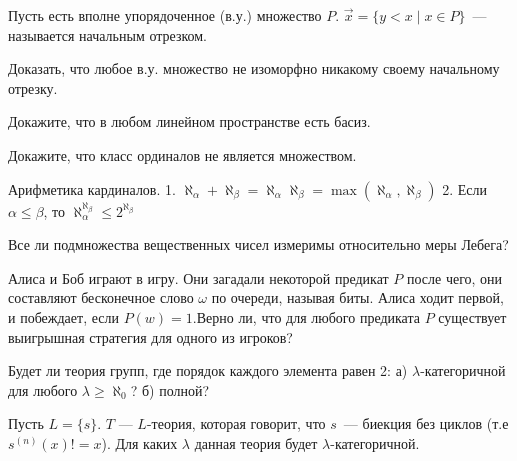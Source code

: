 \setcounter{curtask}{6}


Пусть есть вполне упорядоченное (в.у.) множество $P$.
$\vec{x} = \{y < x \mid x \in P\}$~--- называется начальным отрезком.

\begin{task}
    Доказать, что любое в.у. множество не изоморфно никакому своему начальному отрезку.
\end{task}

\begin{task}
    Докажите, что в любом линейном пространстве есть басиз.
\end{task}

\begin{task}
    Докажите, что класс ординалов не является множеством.
\end{task}

\begin{task}
    Арифметика кардиналов.
    1. $\aleph_{\alpha} + \aleph_{\beta} = \aleph_{\alpha}  \aleph_{\beta} =
    	\max(\aleph_{\alpha}, \aleph_{\beta})$
    2. Если $\alpha \le \beta$, то $\aleph_{\alpha}^{\aleph_{\beta}} \le 2^{\aleph_{\beta}}$
\end{task}

\begin{task}
    Все ли подмножества вещественных чисел измеримы относительно меры Лебега?
\end{task}

\begin{task}
    Алиса и Боб играют в игру. Они загадали некоторой предикат $P$ после чего, они
    составляют бесконечное слово $\omega$ по очереди, называя биты. Алиса ходит
    первой, и побеждает, если $P(w) = 1$.Верно ли, что для любого предиката $P$
    существует выигрышная стратегия для одного из игроков?
\end{task}

\begin{task}
    Будет ли теория групп, где порядок каждого элемента равен 2:
    а) $\lambda$-категоричной для любого $\lambda \ge \aleph_0$?
    б) полной?
\end{task}

\begin{task}
    Пусть $L = \{s\}$. $T$ --- $L$-теория, которая говорит, что $s$~--- биекция без
	циклов (т.е $s^{(n)}(x) != x$). Для каких $\lambda$ данная теория будет
    $\lambda$-категоричной.
\end{task}


